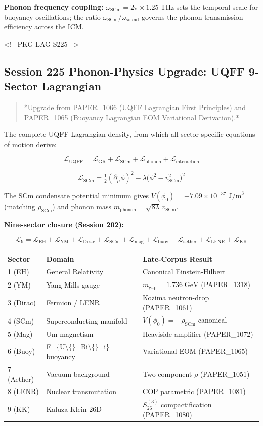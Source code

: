 \documentclass[11pt]{article}
\begin{document}
\textbf{Phonon frequency coupling:} $\omega_{\text{SCm}} = 2\pi \times 1.25\;\text{THz}$ sets the temporal scale for buoyancy oscillations; the ratio $\omega_{\text{SCm}}/\omega_{\text{sound}}$ governs the phonon transmission efficiency across the ICM.

<!-- PKG-LAG-S225 -->

\subsection*{Session 225 Phonon-Physics Upgrade: UQFF 9-Sector Lagrangian}

\begin{quote}
*Upgrade from PAPER\_1066 (UQFF Lagrangian First Principles) and
PAPER\_1065 (Buoyancy Lagrangian EOM Variational Derivation).*
\end{quote}

The complete UQFF Lagrangian density, from which all sector-specific equations of motion derive:

$$\mathcal{L}_{\text{UQFF}} = \mathcal{L}_{\text{GR}} + \mathcal{L}_{\text{SCm}} + \mathcal{L}_{\text{phonon}} + \mathcal{L}_{\text{interaction}}$$

$$\mathcal{L}_{\text{SCm}} = \tfrac{1}{2}(\partial_\mu \phi)^2 - \lambda\bigl(\phi^2 - v_{\text{SCm}}^2\bigr)^2$$

The SCm condensate potential minimum gives $V(\phi_0) = -7.09 \times 10^{-37}\;\text{J/m}^3$ (matching $\rho_{\text{SCm}}$) and phonon mass $m_{\text{phonon}} = \sqrt{8\lambda}\,v_{\text{SCm}}$.

\textbf{Nine-sector closure (Session 202):}

$$\mathcal{L}_{9} = \mathcal{L}_{\text{EH}} + \mathcal{L}_{\text{YM}} + \mathcal{L}_{\text{Dirac}} + \mathcal{L}_{\text{SCm}} + \mathcal{L}_{\text{mag}} + \mathcal{L}_{\text{buoy}} + \mathcal{L}_{\text{aether}} + \mathcal{L}_{\text{LENR}} + \mathcal{L}_{\text{KK}}$$

\begin{center}
\begin{longtable}{lll}
\toprule
Sector & Domain & Late-Corpus Result \tabularnewline
\midrule
\endhead
1 (EH) & General Relativity & Canonical Einstein-Hilbert \tabularnewline
2 (YM) & Yang-Mills gauge & $m_{\text{gap}} = 1.736\;\text{GeV}$ (PAPER\_1318) \tabularnewline
3 (Dirac) & Fermion / LENR & Kozima neutron-drop (PAPER\_1061) \tabularnewline
4 (SCm) & Superconducting manifold & $V(\phi_0) = -\rho_{\text{SCm}}$ canonical \tabularnewline
5 (Mag) & Um magnetism & Heaviside amplifier (PAPER\_1072) \tabularnewline
6 (Buoy) & F\_\{U\textbackslash\{\}\_Bi\textbackslash\{\}\_i\} buoyancy & Variational EOM (PAPER\_1065) \tabularnewline
7 (Aether) & Vacuum background & Two-component $\rho$ (PAPER\_1051) \tabularnewline
8 (LENR) & Nuclear transmutation & COP parametric (PAPER\_1081) \tabularnewline
9 (KK) & Kaluza-Klein 26D & $S_{26}^{(3)}$ compactification (PAPER\_1080) \tabularnewline
\bottomrule
\end{longtable}
\end{center}
\end{document}
